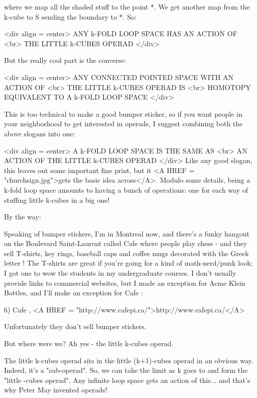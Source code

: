 where we map all the shaded stuff to the point *.  We get 
another map from the k-cube to S sending the boundary to *.
So: 

<div align = center>
             ANY k-FOLD LOOP SPACE HAS AN ACTION OF <br>
                  THE LITTLE k-CUBES OPERAD
</div>

But the really cool part is the converse: 

<div align = center>
           ANY CONNECTED POINTED SPACE WITH AN ACTION OF <br>
                THE LITTLE k-CUBES OPERAD IS  <br>
         HOMOTOPY EQUIVALENT TO A k-FOLD LOOP SPACE
</div>

This is too technical to make a good bumper sticker, so if you 
want people in your neighborhood to get interested in operads, 
I suggest combining both the above slogans into one:

<div align = center>
            A k-FOLD LOOP SPACE IS THE SAME AS <br>
          AN ACTION OF THE LITTLE k-CUBES OPERAD                  
</div>
Like any good slogan, this leaves out some important fine print, 
but it <A HREF = "churchsign.jpg">gets the basic idea across</A>.  
Modulo some details, being a
k-fold loop space amounts to having a bunch of operations: one
for each way of stuffing little k-cubes in a big one!

By the way:

Speaking of bumper stickers, I'm in Montreal now, and there's
a funky hangout on the Boulevard Saint-Laurent called Cafe \pi 
where people play chess - and they sell T-shirts, key rings, 
baseball caps and coffee mugs decorated with the Greek letter \pi !  
The T-shirts are great if you're going for a kind of math-nerd/punk 
look; I got one to wow the students in my undergraduate 
courses.  I don't usually provide links to commercial websites, 
but I made an exception for Acme Klein Bottles, and I'll make an 
exception for Cafe \pi :

6) Cafe \pi , <A HREF = "http://www.cafepi.ca/">http://www.cafepi.ca/</A>

Unfortunately they don't sell bumper stickers.

But where were we?  Ah yes - the little k-cubes operad.

The little k-cubes operad sits in the little (k+1)-cubes operad 
in an obvious way.  Indeed, it's a "sub-operad".  So, we can 
take the limit as k goes to \infty  and form the "little 
\infty -cubes operad".  Any infinite loop space gets an action 
of this... and that's why Peter May invented operads!

